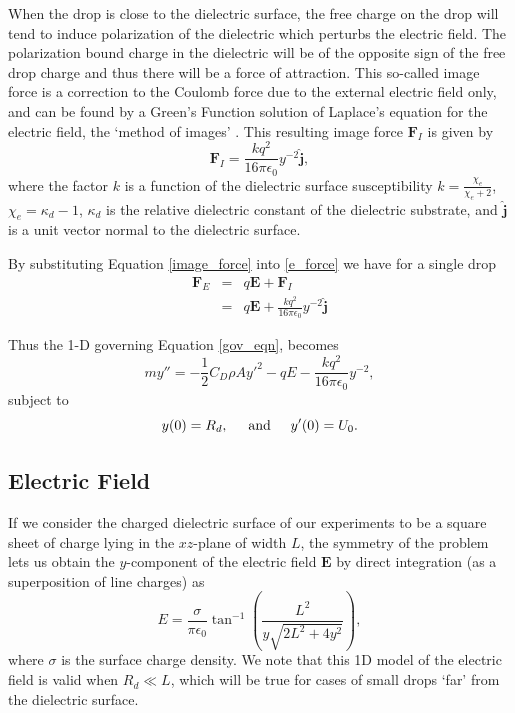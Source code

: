 \documentclass[aip,reprint, floatfix]{revtex4-1}
\begin{document}
When the drop is close to the dielectric surface, the free charge on the drop will tend to induce polarization of the dielectric which perturbs the electric field. The polarization bound charge in the dielectric will be of the opposite sign of the free drop charge and thus there will be a force of attraction. This so-called image force is a correction to the Coulomb force due to the external electric field only, and can be found by a Green's Function solution of Laplace's equation for the electric field, the `method of images' \cite{david_j._griffiths_introduction_1999}. This resulting image force $\mathbf{F}_I$ is given by
\begin{equation}
\mathbf{F}_I = \frac{k q^2}{16 \pi \epsilon_0} y^{-2} \hat{\mathbf{j}},
\label{image_force}
\end{equation}
where the factor $k$ is a function of the dielectric surface susceptibility $k = \frac{\chi_e}{\chi_e + 2}$, $\chi_e = \kappa_d - 1$, $\kappa_d$ is the relative dielectric constant of the dielectric substrate, and $\hat{\mathbf{j}}$ is a unit vector normal to the dielectric surface.

By substituting Equation \ref{image_force} into \ref{e_force} we have for a single drop
\begin{eqnarray}
 \mathbf{F}_E &=& q \mathbf{E} + \mathbf{F}_I \nonumber \\
 &=& q \mathbf{E} + \frac{k q^2}{16 \pi \epsilon_0 } y^{-2} \hat{\mathbf{j}} \label{e_forces}
\end{eqnarray}

Thus the 1-D governing Equation \ref{gov_eqn}, becomes
\begin{equation}
 \label{gov_eqn_subs}
m y'' = - \frac{1}{2} C_D \rho A {y'}^2 - q E - \frac{k q^2}{16 \pi \epsilon_0} y^{-2},
\end{equation}
subject to
\begin{equation*}
y(0) = R_d, \hspace{5 mm} \mbox{and} \hspace{5 mm} y'(0) = U_0 .
\end{equation*}

\subsection{Electric Field}
If we consider the charged dielectric surface of our experiments to be a square sheet of charge lying in the $xz$-plane of width $L$, the symmetry of the problem lets us obtain the $y$-component of the electric field $\mathbf{E}$ by direct integration (as a superposition of line charges) \citep{david_j._griffiths_introduction_1999} as
\begin{equation}
\label{e_field}
E = \frac{\sigma}{ \pi \epsilon_0} \tan^{-1} \left( \frac{L^2}{y \sqrt{2L^2 + 4y^2}}\right)
,\end{equation}
where $\sigma$ is the surface charge density. We note that this 1D model of the electric field is valid when $R_d \ll L$, which will be true for cases of small drops `far' from the dielectric surface. 
\end{document}
